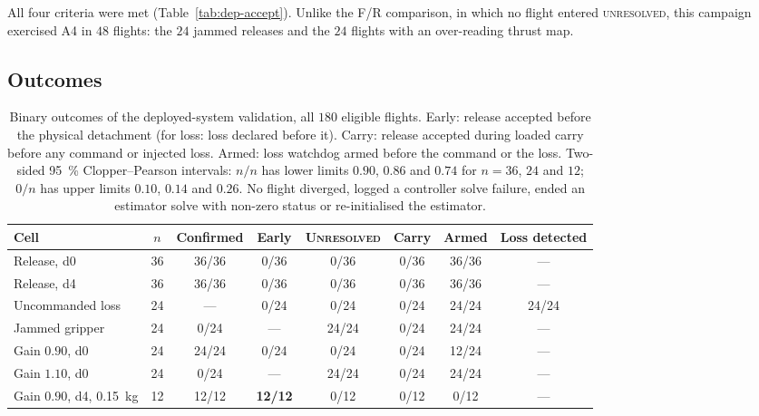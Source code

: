 \begin{spacing}{1.5}
All four criteria were met (Table~\ref{tab:dep-accept}). Unlike the F/R
comparison, in which no flight entered \textsc{unresolved}, this campaign
exercised A4 in $48$ flights: the $24$ jammed releases and the $24$ flights with
an over-reading thrust map.

\subsection{Outcomes}\label{sec:eval:dep:outcomes}

\begin{table}[ht]
\centering
\caption[Binary outcomes of the deployed-system validation]{Binary outcomes of
the deployed-system validation, all $180$ eligible flights. Early: release
accepted before the physical detachment (for loss: loss declared before it).
Carry: release accepted during loaded carry before any command or injected
loss. Armed: loss watchdog armed before the command or the loss. Two-sided
\SI{95}{\percent} Clopper--Pearson intervals: $n/n$ has lower limits $0.90$,
$0.86$ and $0.74$ for $n=36$, $24$ and $12$; $0/n$ has upper limits $0.10$,
$0.14$ and $0.26$. No flight diverged, logged a controller solve failure, ended
an estimator solve with non-zero status or re-initialised the estimator.}
\label{tab:dep-binary}
\footnotesize
\setlength{\tabcolsep}{3pt}
\begin{tabular}{@{}l c c c c c c c@{}}
\toprule
\textbf{Cell} & $n$ & \textbf{Confirmed} & \textbf{Early} & \textbf{\textsc{Unresolved}} & \textbf{Carry} & \textbf{Armed} & \textbf{Loss detected} \\
\midrule
Release, d0            & 36 & 36/36 & 0/36  & 0/36  & 0/36 & 36/36 & --- \\
Release, d4            & 36 & 36/36 & 0/36  & 0/36  & 0/36 & 36/36 & --- \\
Uncommanded loss       & 24 & ---   & 0/24  & 0/24  & 0/24 & 24/24 & 24/24 \\
Jammed gripper         & 24 & 0/24  & ---   & 24/24 & 0/24 & 24/24 & --- \\
Gain $0.90$, d0        & 24 & 24/24 & 0/24  & 0/24  & 0/24 & 12/24 & --- \\
Gain $1.10$, d0        & 24 & 0/24  & ---   & 24/24 & 0/24 & 24/24 & --- \\
Gain $0.90$, d4, \SI{0.15}{\kg} & 12 & 12/12 & \textbf{12/12} & 0/12 & 0/12 & 0/12 & --- \\
\bottomrule
\end{tabular}
\end{table}


\end{spacing}

